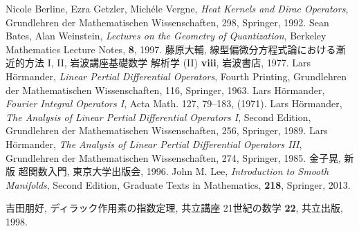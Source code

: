 \begin{thebibliography}{20} 

     Nicole Berline, Ezra Getzler, Mich\'ele Vergne, 
    \textit{Heat Kernels and Dirac Operators}, 
    Grundlehren der Mathematischen Wissenschaften, 298, Springer, 1992.
     Sean Bates, Alan Weinstein, 
    \textit{Lectures on the Geometry of Quantization}, 
    Berkeley Mathematics Lecture Notes, \textbf{8}, 1997.
     藤原大輔, 
    線型偏微分方程式論における漸近的方法 I, II, 
    岩波講座基礎数学 解析学 (II) \textbf{viii}, 岩波書店, 1977.
     Lars H\"ormander, 
    \textit{Linear Pertial Differential Operators}, Fourth Printing, 
    Grundlehren der Mathematischen Wissenschaften, 116, Springer, 1963.
     Lars H\"ormander, 
    \textit{Fourier Integral Operators I}, 
    Acta Math. 127, 79--183, (1971).
     Lars H\"ormander, 
    \textit{The Analysis of Linear Pertial Differential Operators I}, Second Edition,
    Grundlehren der Mathematischen Wissenschaften, 256, Springer, 1989.
     Lars H\"ormander, 
    \textit{The Analysis of Linear Pertial Differential Operators III}, 
    Grundlehren der Mathematischen Wissenschaften, 274, Springer, 1985.
     金子晃, 新版 超関数入門, 東京大学出版会, 1996.
     John M. Lee, 
    \textit{Introduction to Smooth Manifolds}, Second Edition,
    Graduate Texts in Mathematics, \textbf{218}, Springer, 2013.
    
     吉田朋好, ディラック作用素の指数定理, 共立講座 21世紀の数学 \textbf{22}, 共立出版, 1998.
\end{thebibliography}




